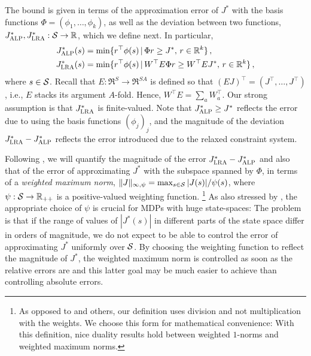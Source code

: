 \documentclass[12pt,draftcls,onecolumn]{IEEEtran}
\begin{document}
The bound is given in terms of the approximation error of $J^*$ with the basis functions $\Phi= (\phi_1,\dots,\phi_k)$, as well as the deviation between two functions, $\Jalpo,\Jlro: \S \to \Re$, which we define next. In particular,
\begin{align*}
\Jalpo(s) & = \min\{ r^\top\phi(s) \,|\, \Phi r \ge J^*, \, r\in \Re^k \}\,,\\
\Jlro(s)    & = \min\{ r^\top\phi(s) \,|\, W^\top E \Phi r \ge W^\top E J^*, \, r\in \Re^k \}\,,
\end{align*}
where $s\in \S$. Recall that $E: \Re^S \to \Re^{SA}$ is defined so that $(E J)^\top = (J^\top, \dots, J^\top)$, i.e., $E$ stacks its argument $A$-fold. Hence, $W^\top E = \sum_a W_a^\top$. Our strong assumption is that $\Jlro$ is finite-valued. Note that $\Jalpo\ge J^*$ reflects the error due to using the basis functions $(\phi_j)_j$, and the magnitude of the deviation $\Jlro-\Jalpo$ reflects the error introduced due to the relaxed constraint system. 

Following \citet{ALP,CS}, we will quantify
the magnitude of the error $\Jlro-\Jalpo$ and also that of the error
of approximating $J^*$ with the subspace spanned by $\Phi$, 
in terms of a \emph{weighted maximum norm}, 
$\norm{J}_{\infty,\psi} = \max_{s\in \S} |J(s)|/\psi(s)$, 
where $\psi: \S \to \Re_{++}$ is a positive-valued weighting function.%
\footnote{As opposed to \citet{ALP} and others, our definition uses division and not multiplication with the weights.
We choose this form for mathematical convenience:
With this definition, nice duality results hold between weighted $1$-norms and weighted maximum norms.
}
As also stressed by \citeauthor{ALP}, 
the appropriate choice of $\psi$ is crucial for MDPs with huge state-spaces:
The problem is that if the range of values of $|J^*(s)|$ in different parts of the state space
differ in orders of magnitude, we do not expect to be able to control the error of approximating $J^*$ uniformly over $\S$.
By choosing the weighting function to reflect the magnitude of $J^*$, the weighted maximum norm is controlled
as soon as the relative errors are and this latter goal may be much easier to achieve than controlling 
absolute errors.
\end{document}
